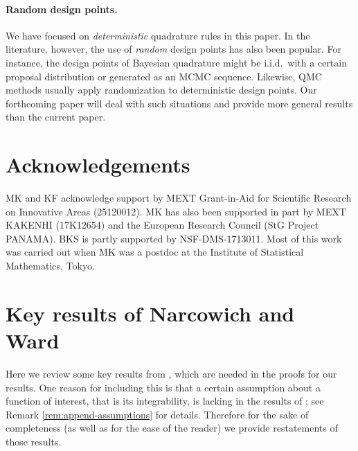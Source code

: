\documentclass[11pt]{article}
\theoremstyle{remark}
\theoremstyle{example}
\theoremstyle{remark}
\newcommand{\blue}{\textcolor{blue}}
\begin{document}
\paragraph{Random design points.}
We have focused on {\em deterministic} quadrature rules in this paper.
In the literature, however, the use of {\em random} design points has also been popular.
For instance, the design points of Bayesian quadrature might be i.i.d.~with a certain proposal distribution or generated as an MCMC sequence.
Likewise, QMC methods usually apply randomization to deterministic design points.
Our forthcoming paper will deal with such situations and provide more general results than the current paper.


\section*{Acknowledgements}
MK and KF acknowledge support by MEXT Grant-in-Aid for Scientific Research on Innovative Areas (25120012). 
MK has also been supported in part by MEXT KAKENHI (17K12654) and the European Research Council (StG Project PANAMA).
BKS is partly supported by NSF-DMS-1713011. Most of this work was carried out when MK was a postdoc at the 
Institute of Statistical Mathematics, Tokyo.


\appendix
\begin{comment}
\setcounter{remark}{0}
\renewcommand{\theremark}{\Alph{section}.\arabic{remark}}
\setcounter{theorem}{0}
\renewcommand{\thetheorem}{\Alph{section}.\arabic{theorem}}
\setcounter{lemma}{0}
\renewcommand{\thelemma}{\Alph{section}.\arabic{lemma}}
\setcounter{proposition}{0}
\renewcommand{\theproposition}{\Alph{section}.\arabic{proposition}}
\setcounter{equation}{0}
\renewcommand{\theequation}{\Alph{section}.\arabic{equation}}
\end{comment}

\def\thesection{Appendix \Alph{section}}


\section{Key results of Narcowich and Ward \cite{NarWar04}} \label{sec:results_NarWar04}
Here we review some key results from \cite{NarWar04}, which are needed in the proofs for our results.
One reason for including this is that a certain assumption about a function of interest, that is its integrability, is lacking in the results of  \cite{NarWar04}; see Remark \ref{rem:append-assumptions} for details. Therefore for the sake of completeness (as well as for the ease of the reader) we provide restatements of those results.
\end{document}
